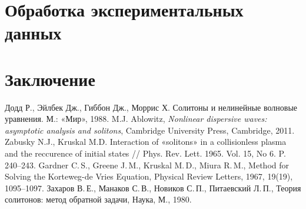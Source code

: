 \documentclass[12pt, a4paper]{report}
\begin{document}
\chapter{Обработка экспериментальных данных}


\chapter*{Заключение}


\begin{thebibliography}{99}
	 Додд Р., Эйлбек Дж., Гиббон Дж., Моррис Х. Солитоны и нелинейные волновые уравнения. М.: «Мир», 1988.
	 M.J. Ablowitz, \textit{Nonlinear dispersive waves: asymptotic analysis and solitons}, Cambridge University Press, Cambridge, 2011.
	 Zabusky N.J., Kruskal M.D. Interaction of «solitons» in a collisionless plasma and the reccurence of initial states // Phys. Rev. Lett. 1965.	Vol. 15, No 6. P. 240–243.
	 Gardner C.\,S., Greene J.\,M., Kruskal M.\,D., Miura R.\,M., Method for Solving the Korteweg-de Vries Equation, Physical Review Letters, 1967, 19(19), 1095--1097.
	 Захаров В.\,Е., Манаков С.\,В., Новиков С.\,П., Питаевский Л.\,П., Теория солитонов: метод обратной задачи, Наука, М., 1980. 
	

\end{thebibliography}
\end{document}

